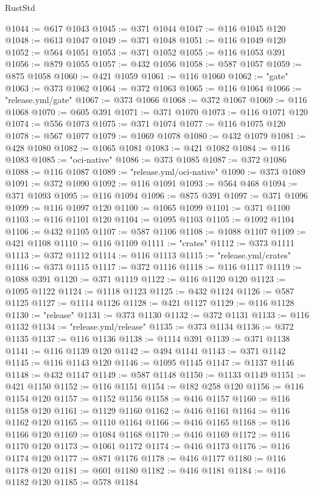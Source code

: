 \begin{lexlean}{RustStd}
\begin{coremodule}
@1044 := @617 @1043
@1045 := @371 @1044
@1047 := @116 @1045 @120
@1048 := @613 @1047
@1049 := @371 @1048
@1051 := @116 @1049 @120
@1052 := @564 @1051
@1053 := @371 @1052
@1055 := @116 @1053 @391
@1056 := @879 @1055
@1057 := @432 @1056
@1058 := @587 @1057
@1059 := @875 @1058
@1060 := @421 @1059
@1061 := @116 @1060
@1062 := "gate"
@1063 := @373 @1062
@1064 := @372 @1063
@1065 := @116 @1064
@1066 := "release.yml/gate"
@1067 := @373 @1066
@1068 := @372 @1067
@1069 := @116 @1068
@1070 := @605 @391
@1071 := @371 @1070
@1073 := @116 @1071 @120
@1074 := @556 @1073
@1075 := @371 @1074
@1077 := @116 @1075 @120
@1078 := @567 @1077
@1079 := @1069 @1078
@1080 := @432 @1079
@1081 := @428 @1080
@1082 := @1065 @1081
@1083 := @421 @1082
@1084 := @116 @1083
@1085 := "oci-native"
@1086 := @373 @1085
@1087 := @372 @1086
@1088 := @116 @1087
@1089 := "release.yml/oci-native"
@1090 := @373 @1089
@1091 := @372 @1090
@1092 := @116 @1091
@1093 := @564 @468
@1094 := @371 @1093
@1095 := @116 @1094
@1096 := @875 @391
@1097 := @371 @1096
@1099 := @116 @1097 @120
@1100 := @1065 @1099
@1101 := @371 @1100
@1103 := @116 @1101 @120
@1104 := @1095 @1103
@1105 := @1092 @1104
@1106 := @432 @1105
@1107 := @587 @1106
@1108 := @1088 @1107
@1109 := @421 @1108
@1110 := @116 @1109
@1111 := "crates"
@1112 := @373 @1111
@1113 := @372 @1112
@1114 := @116 @1113
@1115 := "release.yml/crates"
@1116 := @373 @1115
@1117 := @372 @1116
@1118 := @116 @1117
@1119 := @1088 @391
@1120 := @371 @1119
@1122 := @116 @1120 @120
@1123 := @1095 @1122
@1124 := @1118 @1123
@1125 := @432 @1124
@1126 := @587 @1125
@1127 := @1114 @1126
@1128 := @421 @1127
@1129 := @116 @1128
@1130 := "release"
@1131 := @373 @1130
@1132 := @372 @1131
@1133 := @116 @1132
@1134 := "release.yml/release"
@1135 := @373 @1134
@1136 := @372 @1135
@1137 := @116 @1136
@1138 := @1114 @391
@1139 := @371 @1138
@1141 := @116 @1139 @120
@1142 := @494 @1141
@1143 := @371 @1142
@1145 := @116 @1143 @120
@1146 := @1095 @1145
@1147 := @1137 @1146
@1148 := @432 @1147
@1149 := @587 @1148
@1150 := @1133 @1149
@1151 := @421 @1150
@1152 := @116 @1151
@1154 := @182 @258 @120
@1156 := @116 @1154 @120
@1157 := @1152 @1156
@1158 := @416 @1157
@1160 := @116 @1158 @120
@1161 := @1129 @1160
@1162 := @416 @1161
@1164 := @116 @1162 @120
@1165 := @1110 @1164
@1166 := @416 @1165
@1168 := @116 @1166 @120
@1169 := @1084 @1168
@1170 := @416 @1169
@1172 := @116 @1170 @120
@1173 := @1061 @1172
@1174 := @416 @1173
@1176 := @116 @1174 @120
@1177 := @871 @1176
@1178 := @416 @1177
@1180 := @116 @1178 @120
@1181 := @601 @1180
@1182 := @416 @1181
@1184 := @116 @1182 @120
@1185 := @578 @1184

\end{coremodule}
\end{lexlean}
